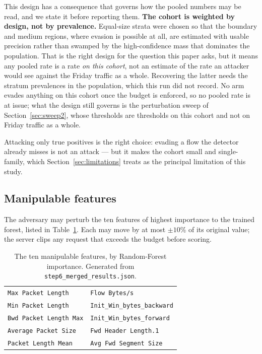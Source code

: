 \documentclass[journal]{IEEEtran}
\theoremstyle{definition}
\newcommand{\budgetpct}{10}
\begin{document}
This design has a consequence that governs how the pooled numbers may be read,
and we state it before reporting them. \textbf{The cohort is weighted by design,
not by prevalence.} Equal-size strata were chosen so that the boundary and
medium regions, where evasion is possible at all, are estimated with usable
precision rather than swamped by the high-confidence mass that dominates the
population. That is the right design for the question this paper asks, but it
means any pooled rate is a rate \emph{on this cohort}, not an estimate of the
rate an attacker would see against the Friday traffic as a whole. Recovering the
latter needs the stratum prevalences in the population, which this run did not
record. No arm evades anything on this cohort once the
budget is enforced, so no pooled rate is at issue; what the design still governs
is the perturbation sweep of Section~\ref{sec:sweep2}, whose thresholds are
thresholds on this cohort and not on Friday traffic as a whole.

Attacking only true positives is the right choice: evading a flow the
detector already misses is not an attack --- but it makes the cohort small and
single-family, which Section~\ref{sec:limitations} treats as the principal
limitation of this study.

\subsection{Manipulable features}
The adversary may perturb the ten features of highest importance to the trained
forest, listed in Table~\ref{tab:features}. Each may move by at most
$\pm\budgetpct$\% of its original value; the server clips any request that
exceeds the budget before scoring.

\begin{table}[t]
\caption{The ten manipulable features, by Random-Forest importance.
Generated from \texttt{step6\_\allowbreak{}merged\_\allowbreak{}results.\allowbreak{}json}.}
\label{tab:features}
\centering
\footnotesize
\begin{tabular}{ll}
\toprule
\texttt{Max Packet Length} & \texttt{Flow Bytes/s} \\
\texttt{Min Packet Length} & \texttt{Init\_\allowbreak{}Win\_\allowbreak{}bytes\_\allowbreak{}backward} \\
\texttt{Bwd Packet Length Max} & \texttt{Init\_\allowbreak{}Win\_\allowbreak{}bytes\_\allowbreak{}forward} \\
\texttt{Average Packet Size} & \texttt{Fwd Header Length.\allowbreak{}1} \\
\texttt{Packet Length Mean} & \texttt{Avg Fwd Segment Size} \\
\bottomrule
\end{tabular}
\end{table}
\end{document}
